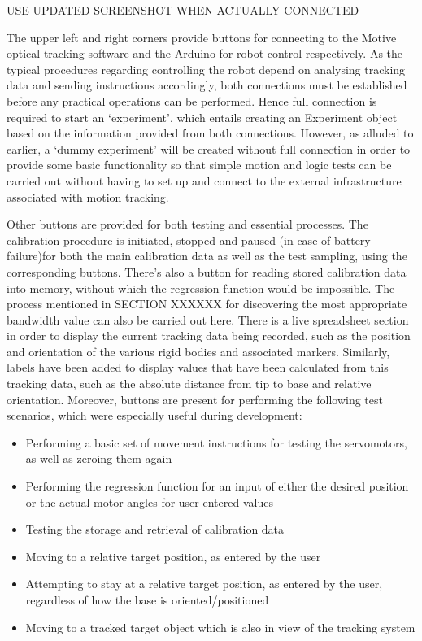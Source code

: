 \documentclass[11pt]{article}
\begin{document}
USE UPDATED SCREENSHOT WHEN ACTUALLY CONNECTED

The upper left and right corners provide buttons for connecting to the Motive optical tracking software and the Arduino for robot control respectively. As the typical procedures regarding controlling the robot depend on analysing tracking data and sending instructions accordingly, both connections must be established before any practical operations can be performed. Hence full connection is required to start an `experiment', which entails creating an Experiment object based on the information provided from both connections. However, as alluded to earlier, a `dummy experiment' will be created without full connection in order to provide some basic functionality so that simple motion and logic tests can be carried out without having to set up and connect to the external infrastructure associated with motion tracking. 

Other buttons are provided for both testing and essential processes. The calibration procedure is initiated, stopped and paused (in case of battery failure)for both the main calibration data as well as the test sampling, using the corresponding buttons. There's also a button for reading stored calibration data into memory, without which the regression function would be impossible. The process mentioned in SECTION XXXXXX for discovering the most appropriate bandwidth value can also be carried out here. There is a live spreadsheet section in order to display the current tracking data being recorded, such as the position and orientation of the various rigid bodies and associated markers. Similarly, labels have been added to display values that have been calculated from this tracking data, such as the absolute distance from tip to base and relative orientation. Moreover, buttons are present for performing the following test scenarios, which were especially useful during development:
\begin{itemize}
\item{Performing a basic set of movement instructions for testing the servomotors, as well as zeroing them again}
\item{Performing the regression function for an input of either the desired position or the actual motor angles for user entered values}
\item{Testing the storage and retrieval of calibration data}
\item{Moving to a relative target position, as entered by the user}
\item{Attempting to stay at a relative target position, as entered by the user, regardless of how the base is oriented/positioned}
\item{Moving to a tracked target object which is also in view of the tracking system}
\end{itemize}
\end{document}
